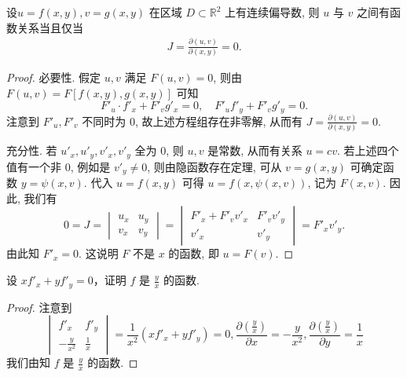 \documentclass[../../main.tex]{subfiles}
\begin{document}
\begin{theorem}\label{theorem:定理雅克比行列式为0的充要条件}
设\( u = f(x, y), v = g(x, y) \) 在区域 \( D \subset \mathbb{R}^2 \) 上有连续偏导数, 则 \( u \) 与 \( v \) 之间有函数关系当且仅当
\begin{align*}
J = \frac{\partial (u, v)}{\partial (x, y)} = 0.
\end{align*}
\end{theorem}
\begin{proof}
必要性. 假定 \( u, v \) 满足 \( F(u, v) = 0 \), 则由 \( F(u, v) = F[f(x, y), g(x, y)] \) 可知
\[
F'_u \cdot f'_x + F'_v g'_x = 0, \quad F'_u f'_y + F'_v g'_y = 0.
\]
注意到 \( F'_u, F'_v \) 不同时为 0, 故上述方程组存在非零解, 从而有 \( J = \frac{\partial (u, v)}{\partial (x, y)} = 0 \).

充分性. 若 \( u'_x, u'_y, v'_x, v'_y \) 全为 0, 则 \( u, v \) 是常数, 从而有关系 \( u = cv \). 若上述四个值有一个非 0, 例如是 \( v'_y \neq 0 \), 则由隐函数存在定理, 可从 \( v = g(x, y) \) 可确定函数 \( y = \psi(x, v) \). 代入 \( u = f(x, y) \) 可得 \( u = f(x, \psi(x, v)) \), 记为 \( F(x, v) \).
因此, 我们有
\[
0 = J = \begin{vmatrix}
u_x & u_y \\
v_x & v_y
\end{vmatrix} = \begin{vmatrix}
F'_x + F'_v v'_x & F'_v v'_y \\
v'_x & v'_y
\end{vmatrix} = F'_x v'_y.
\]
由此知 \( F'_x = 0 \). 这说明 \( F \) 不是 \( x \) 的函数, 即 \( u = F(v) \).
\end{proof}

\begin{example}
设 \( x f'_x + y f'_y = 0 \)，证明 \( f \) 是 \( \frac{y}{x} \) 的函数.
\end{example}
\begin{proof}
注意到
\[
\begin{vmatrix}
f'_x & f'_y \\
-\frac{y}{x^2} & \frac{1}{x}
\end{vmatrix} = \frac{1}{x^2} \left( x f'_x + y f'_y \right) = 0, \frac{\partial \left( \frac{y}{x} \right)}{\partial x} = -\frac{y}{x^2}, \frac{\partial \left( \frac{y}{x} \right)}{\partial y} = \frac{1}{x}
\]
我们由知 \( f \) 是 \( \frac{y}{x} \) 的函数.
\end{proof}
\end{document}
